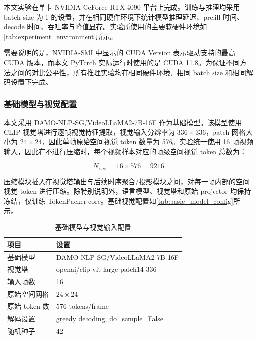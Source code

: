 本文实验在单卡 NVIDIA GeForce RTX 4090 平台上完成。训练与推理均采用 batch size 为 1 的设置，并在相同硬件环境下统计模型推理延迟、prefill 时间、decode 时间、吞吐率与峰值显存。实验所使用的主要软硬件环境如\autoref{tab:experiment_environment}所示。

需要说明的是，NVIDIA-SMI 中显示的 CUDA Version 表示驱动支持的最高 CUDA 版本，而本文 PyTorch 实际运行时使用的是 CUDA 11.8。为保证不同方法之间的对比公平性，所有推理实验均在相同硬件环境、相同 batch size 和相同解码设置下完成。

\subsubsection{基础模型与视觉配置}

本文采用 DAMO-NLP-SG/VideoLLaMA2-7B-16F 作为基础模型。该模型使用 CLIP 视觉塔进行逐帧视觉特征提取，视觉输入分辨率为 $336\times336$，patch 网格大小为 $24\times24$，因此单帧原始空间视觉 token 数量为 576。实验统一使用 16 帧视频输入，因此在不进行压缩时，每个视频样本对应的帧级空间视觉 token 总数为：

\begin{equation}
    \label{equ:raw_video_token_number_exp}
    N_{\mathrm{raw}} = 16 \times 576 = 9216
\end{equation}

压缩模块插入在视觉塔输出与后续时序聚合/投影模块之间，对每一帧内部的空间视觉 token 进行压缩。除特别说明外，语言模型、视觉塔和原始 projector 均保持冻结，仅训练 TokenPacker core。基础视觉配置如\autoref{tab:basic_model_config}所示。

\begin{table}[!htbp]
    \centering
    \caption{\label{tab:basic_model_config}基础模型与视觉输入配置}
    \begin{tabularx}{\textwidth}{lX}
        \toprule
        项目 & 设置 \\
        \midrule
        基础模型 & DAMO-NLP-SG/VideoLLaMA2-7B-16F \\
        视觉塔 & openai/clip-vit-large-patch14-336 \\
        输入帧数 & 16 \\
        原始空间网格 & $24\times24$ \\
        原始 token 数 & 576 tokens/frame \\
        解码设置 & greedy decoding, do\_sample=False \\
        随机种子 & 42 \\
        \bottomrule
    \end{tabularx}
\end{table}

